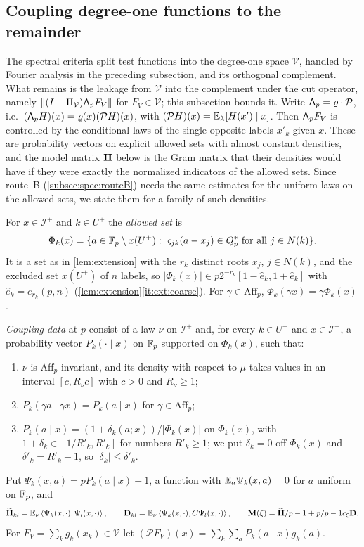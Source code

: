 \subsection{Coupling degree-one functions to the remainder}\label{subsec:spec:coupling}

The spectral criteria split test functions into the degree-one
space $\mathcal V$, handled by Fourier analysis in the preceding
subsection, and its orthogonal complement. What remains is the
leakage from $\mathcal V$ into the complement under the cut
operator, namely $\left\|(I-\Pi_{\mathcal V})\mathsf A_p F_V\right\|$ for
$F_V\in\mathcal V$; this subsection bounds it. Write $\mathsf A_p=\varrho\cdot\mathcal P$, i.e.\ $(\mathsf A_p H)(x)=\varrho(x)(\mathcal PH)(x)$, with $(\mathcal PH)(x)=\mathbb E_\lambda[H(x')\mid x]$. Then
$\mathsf A_p F_V$ is controlled by the conditional laws of the single opposite labels
$x'_k$ given $x$. These are probability vectors on explicit allowed sets with
almost constant densities, and the model matrix $\mathbf H$ below is the Gram
matrix that their densities would have if they were exactly the normalized
indicators of the allowed sets. Since route~B
(\cref{subsec:spec:routeB}) needs the same estimates for the uniform laws on
the allowed sets, we state them for a family of such densities.

For $x\in\mathcal I^+$ and $k\in U^+$ the \emph{allowed set} is
\[
  \Phi_k(x)=\{a\in\Fp\setminus x(U^+):\ \varsigma_{jk}(a-x_j)\in\Qsq\ \text{for all}\ j\in N(k)\}.
\]
It is a set as in \cref{lem:extension} with the $r_k$ distinct roots $x_j$,
$j\in N(k)$, and the excluded set $x(U^+)$ of $n$ labels, so
$|\Phi_k(x)|\in p2^{-r_k}[1-\hat e_k,1+\hat e_k]$ with $\hat e_k=e_{r_k}(p,n)$
(\cref{lem:extension}\ref{it:ext:coarse}). For $\gamma\in\mathrm{Aff}_p$,
$\Phi_k(\gamma x)=\gamma\Phi_k(x)$.

\begin{definition}\label{def:coupling-data}
\emph{Coupling data} at $p$ consist of a law $\nu$ on $\mathcal I^+$ and, for every
$k\in U^+$ and $x\in\mathcal I^+$, a probability vector $P_k(\cdot\mid x)$ on $\mathbb F_p$
supported on $\Phi_k(x)$, such that:
\begin{enumerate}[label=\textup{(\roman*)}]
\item $\nu$ is $\mathrm{Aff}_p$-invariant, and its density with respect to $\mu$ takes
  values in an interval $[c,R_\nu c]$ with $c>0$ and $R_\nu\ge1$;
\item $P_k(\gamma a\mid\gamma x)=P_k(a\mid x)$ for $\gamma\in\mathrm{Aff}_p$;
\item $P_k(a\mid x)=(1+\delta_k(a;x))/|\Phi_k(x)|$ on $\Phi_k(x)$, with
  $1+\delta_k\in[1/R'_k,R'_k]$ for numbers $R'_k\ge1$; we put $\delta_k=0$ off
  $\Phi_k(x)$ and $\delta'_k=R'_k-1$, so $|\delta_k|\le\delta'_k$.
\end{enumerate}
Put $\Psi_k(x,a)=pP_k(a\mid x)-1$, a function with $\mathbb E_a\Psi_k(x,a)=0$ for $a$ uniform on $\mathbb F_p$, and
\[
  \widetilde{\mathbf H}_{kl}=\mathbb E_\nu\left\langle \Psi_k(x,\cdot),\Psi_l(x,\cdot)\right\rangle,\qquad
  \mathbf D_{kl}=\mathbb E_\nu\left\langle \Psi_k(x,\cdot),C\Psi_l(x,\cdot)\right\rangle,\qquad
  \mathbf M(\xi)=\widetilde{\mathbf H}/p-1+p/p-1c_\xi\mathbf D .
\]
For $F_V=\sum_kg_k(x_k)\in\mathcal V$ let $(\mathcal PF_V)(x)=\sum_k\sum_aP_k(a\mid x)g_k(a)$.
\end{definition}

